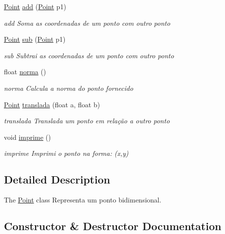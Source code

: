\begin{DoxyCompactItemize}
\hyperlink{class_point}{Point} \hyperlink{class_point_a9dbea84b07b0a8ec3bbb9e58b3d15899}{add} (\hyperlink{class_point}{Point} p1)
\begin{DoxyCompactList}\small\item\em add Soma as coordenadas de um ponto com outro ponto \end{DoxyCompactList}\item 
\hyperlink{class_point}{Point} \hyperlink{class_point_a9cf2c53b0a4e6282a6712824bb4e9b00}{sub} (\hyperlink{class_point}{Point} p1)
\begin{DoxyCompactList}\small\item\em sub Subtrai as coordenadas de um ponto com outro ponto \end{DoxyCompactList}\item 
float \hyperlink{class_point_abd2618d1f505d9392893273a66e7c9b2}{norma} ()
\begin{DoxyCompactList}\small\item\em norma Calcula a norma do ponto fornecido \end{DoxyCompactList}\item 
\hyperlink{class_point}{Point} \hyperlink{class_point_a8fc932c5dcb7ef85208b01f7efa83163}{translada} (float a, float b)
\begin{DoxyCompactList}\small\item\em translada Translada um ponto em relação a outro ponto \end{DoxyCompactList}\item 
void \hyperlink{class_point_a1fb5c2501c27ab2cbc99d06c2a26a741}{imprime} ()\hypertarget{class_point_a1fb5c2501c27ab2cbc99d06c2a26a741}{}\label{class_point_a1fb5c2501c27ab2cbc99d06c2a26a741}

\begin{DoxyCompactList}\small\item\em imprime Imprimi o ponto na forma\+: (x,y) \end{DoxyCompactList}\end{DoxyCompactItemize}


\subsection{Detailed Description}
The \hyperlink{class_point}{Point} class Representa um ponto bidimensional. 

\subsection{Constructor \& Destructor Documentation}
